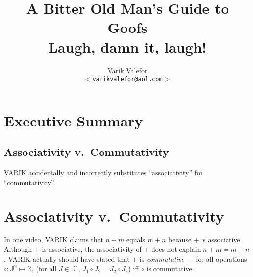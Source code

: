 \documentclass{article}
\title{A Bitter Old Man's Guide to Goofs\\
{\scriptsize Laugh, damn it, laugh!}}
\author{Varik Valefor\\
\texttt{$<$varikvalefor@aol.com$>$}}
\begin{document}
	\maketitle
	\section{Executive Summary}
		\subsection{Associativity v.\ Commutativity}
			VARIK accidentally and incorrectly substitutes ``associativity''
			for ``commutativity''.
	\section{Associativity v.\ Commutativity}
		In one video, VARIK claims that $n + m$ equals $m + n$ because $+$ is associative.  Although $+$ is associative, the associativity of $+$ does not explain $n + m = m + n$.  VARIK actually should have stated that $+$ is \textit{commutative} --- for all operations $\circ : \mathbb J^2 \mapsto \mathbb K$, (for all $J \in \mathbb J^2$, $J_1 \circ J_2 = J_2 \circ J_2$) iff $\circ$ is commutative.
\end{document}

